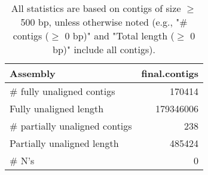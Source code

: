 \documentclass[12pt,a4paper]{article}
\begin{document}
\begin{table}[ht]
\begin{center}
\caption{All statistics are based on contigs of size $\geq$ 500 bp, unless otherwise noted (e.g., "\# contigs ($\geq$ 0 bp)" and "Total length ($\geq$ 0 bp)" include all contigs).}
\begin{tabular}{|l*{1}{|r}|}
\hline
Assembly & final.contigs \\ \hline
\# fully unaligned contigs & 170414 \\ \hline
Fully unaligned length & 179346006 \\ \hline
\# partially unaligned contigs & 238 \\ \hline
Partially unaligned length & 485424 \\ \hline
\# N's & 0 \\ \hline
\end{tabular}
\end{center}
\end{table}
\end{document}
